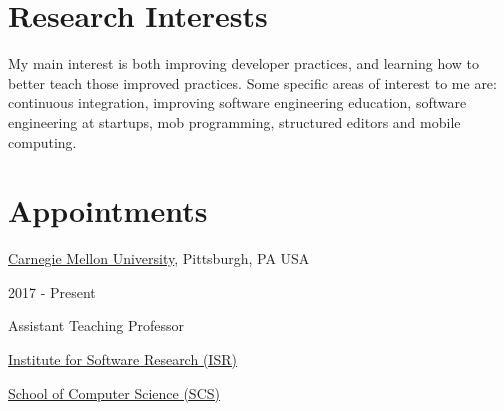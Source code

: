 \documentclass[10pt]{article}
\begin{document}

% 
\thispagestyle{empty}
\section{Research Interests}
My main interest is both improving developer practices, and learning how to better teach those improved practices. 
Some specific areas of interest to me are: continuous integration, improving software engineering education, software engineering at startups, mob programming, structured editors and mobile computing.
%



\section{Appointments}

 \href{https://www.cmu.edu/}{Carnegie Mellon University},
Pittsburgh, PA USA

2017 - Present

Assistant Teaching Professor

\href{http://www.isri.cmu.edu/}{Institute for Software Research (ISR)}

\href{https://www.cs.cmu.edu/}{School of Computer Science (SCS)}    

%
\end{document}
